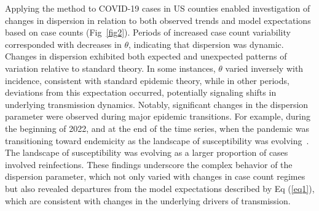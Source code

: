 \documentclass[11pt,letterpaper]{article}
\begin{document}
Applying the method to COVID-19 cases in US counties enabled investigation of changes in dispersion in relation to both observed trends and model expectations based on case counts (Fig~\ref{fig2}).  
Periods of increased case count variability corresponded with decreases in $\theta$, indicating that dispersion was dynamic. 
Changes in dispersion exhibited both expected and unexpected patterns of variation relative to standard theory.  
In some instances, $\theta$ varied inversely with incidence, consistent with standard epidemic theory, while in other periods, deviations from this expectation occurred, potentially signaling shifts in underlying transmission dynamics.  
Notably, significant changes in the dispersion parameter were observed during major epidemic transitions.
For example, during the beginning of 2022, and at the end of the time series, when the pandemic was transitioning toward endemicity as the landscape of susceptibility was evolving~\citep{lavine2021immunological}.  
The landscape of susceptibility was evolving as a larger proportion of cases involved reinfections.  
These findings underscore the complex behavior of the dispersion parameter, 
which not only varied with changes in case count regimes but also revealed 
departures from the model expectations described by Eq (\ref{eq1}), which are 
consistent with changes in the underlying drivers of transmission. 
\end{document}
